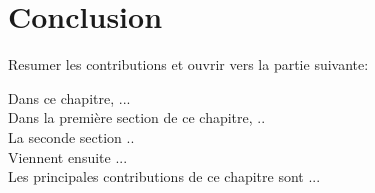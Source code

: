 \section*{Conclusion}
\label{chap:2:sec:conclusion}

Resumer les contributions et ouvrir vers la partie suivante:

Dans ce chapitre, ...\\
Dans la premi\`ere section de ce chapitre, ..\\
La seconde section ..\\
Viennent ensuite ...\\
Les principales contributions de ce chapitre sont ...\\
